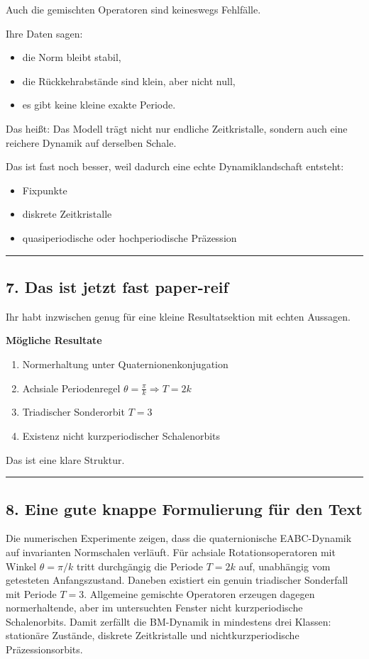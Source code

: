 \documentclass[11pt,a4paper]{article}
\theoremstyle{definition}
\begin{document}
	Auch die gemischten Operatoren sind keineswegs Fehlfälle.
	
	Ihre Daten sagen:
	\begin{itemize}
		\item die Norm bleibt stabil,
		\item die Rückkehrabstände sind klein, aber nicht null,
		\item es gibt keine kleine exakte Periode.
	\end{itemize}
	Das heißt: Das Modell trägt nicht nur endliche Zeitkristalle, sondern auch eine reichere Dynamik auf derselben Schale.
	
	Das ist fast noch besser, weil dadurch eine echte Dynamiklandschaft entsteht:
	\begin{itemize}
		\item Fixpunkte
		\item diskrete Zeitkristalle
		\item quasiperiodische oder hochperiodische Präzession
	\end{itemize}
	
	\medskip\hrule\medskip
	
	\subsection*{7. Das ist jetzt fast paper-reif}
	
	Ihr habt inzwischen genug für eine kleine Resultatsektion mit echten Aussagen.
	
	\textbf{Mögliche Resultate}
	\begin{enumerate}
		\item Normerhaltung unter Quaternionenkonjugation
		\item Achsiale Periodenregel $\theta=\frac{\pi}{k}\Rightarrow T=2k$
		\item Triadischer Sonderorbit $T=3$
		\item Existenz nicht kurzperiodischer Schalenorbits
	\end{enumerate}
	Das ist eine klare Struktur.
	
	\medskip\hrule\medskip
	
	\subsection*{8. Eine gute knappe Formulierung für den Text}
	
	Die numerischen Experimente zeigen, dass die quaternionische EABC-Dynamik auf invarianten Normschalen verläuft. Für achsiale Rotationsoperatoren mit Winkel $\theta=\pi/k$ tritt durchgängig die Periode $T=2k$ auf, unabhängig vom getesteten Anfangszustand. Daneben existiert ein genuin triadischer Sonderfall mit Periode $T=3$. Allgemeine gemischte Operatoren erzeugen dagegen normerhaltende, aber im untersuchten Fenster nicht kurzperiodische Schalenorbits. Damit zerfällt die BM-Dynamik in mindestens drei Klassen: stationäre Zustände, diskrete Zeitkristalle und nichtkurzperiodische Präzessionsorbits.
	
\end{document}

